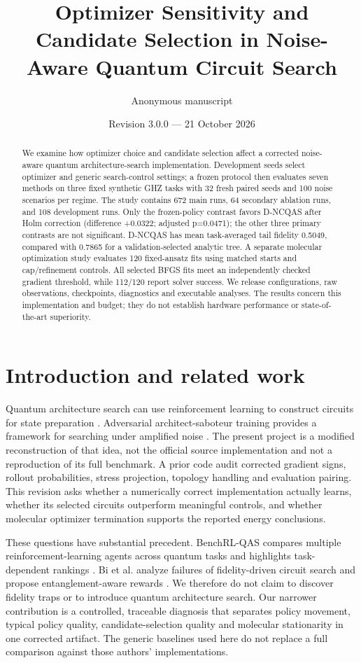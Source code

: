 \documentclass[11pt]{article}
\title{Optimizer Sensitivity and Candidate Selection in Noise-Aware Quantum Circuit Search}
\author{Anonymous manuscript}
\date{Revision 3.0.0 --- 21 October 2026}
\begin{document}
\maketitle
\begin{abstract}We examine how optimizer choice and candidate selection affect a corrected noise-aware quantum architecture-search implementation. Development seeds select optimizer and generic search-control settings; a frozen protocol then evaluates seven methods on three fixed synthetic GHZ tasks with 32 fresh paired seeds and 100 noise scenarios per regime. The study contains 672 main runs, 64 secondary ablation runs, and 108 development runs. Only the frozen-policy contrast favors D-NCQAS after Holm correction (difference +0.0322; adjusted p=0.0471); the other three primary contrasts are not significant. D-NCQAS has mean task-averaged tail fidelity 0.5049, compared with 0.7865 for a validation-selected analytic tree. A separate molecular optimization study evaluates 120 fixed-ansatz fits using matched starts and cap/refinement controls. All selected BFGS fits meet an independently checked gradient threshold, while 112/120 report solver success. We release configurations, raw observations, checkpoints, diagnostics and executable analyses. The results concern this implementation and budget; they do not establish hardware performance or state-of-the-art superiority.\end{abstract}

\section{Introduction and related work}
Quantum architecture search can use reinforcement learning to construct circuits for state preparation \cite{qas}. Adversarial architect-saboteur training provides a framework for searching under amplified noise \cite{coev}. The present project is a modified reconstruction of that idea, not the official source implementation and not a reproduction of its full benchmark. A prior code audit corrected gradient signs, rollout probabilities, stress projection, topology handling and evaluation pairing. This revision asks whether a numerically correct implementation actually learns, whether its selected circuits outperform meaningful controls, and whether molecular optimizer termination supports the reported energy conclusions.

These questions have substantial precedent. BenchRL-QAS compares multiple reinforcement-learning agents across quantum tasks and highlights task-dependent rankings \cite{bench}. Bi et al. analyze failures of fidelity-driven circuit search and propose entanglement-aware rewards \cite{trap}. We therefore do not claim to discover fidelity traps or to introduce quantum architecture search. Our narrower contribution is a controlled, traceable diagnosis that separates policy movement, typical policy quality, candidate-selection quality and molecular stationarity in one corrected artifact. The generic baselines used here do not replace a full comparison against those authors' implementations.
\end{document}
